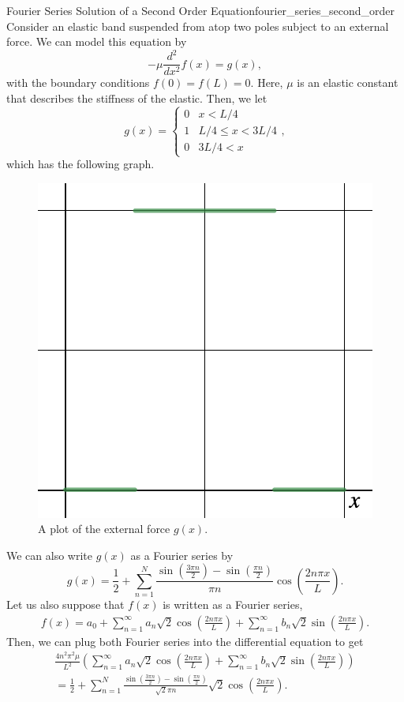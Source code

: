 \begin{ex}{Fourier Series Solution of a Second Order Equation}{fourier_series_second_order}
	Consider an elastic band suspended from atop two poles subject to an external force. We can model this equation by
	\[
	-\mu\frac{d^2}{dx^2}f(x) = g(x),
	\]
	with the boundary conditions $f(0)=f(L)=0$. Here, $\mu$ is an elastic constant that describes the stiffness of the elastic.  Then, we let 
	\[
	g(x) = \begin{cases} 0 & x<L/4 \\ 1 & L/4 \leq x < 3L/4 \\ 0 & 3L/4<x \end{cases},
	\]
	which has the following graph.
	\begin{figure}[H]
		\centering
		\includegraphics[width=.5\textwidth]{Figures_Part_5/square_wave_force.png}
		\caption{A plot of the external force $g(x)$.}
	\end{figure}
	We can also write $g(x)$ as a Fourier series by
	\[
	g(x) = \frac{1}{2}+\sum_{n=1}^{N}\frac{\sin\left(\frac{3\pi n}{2}\right)-\sin\left(\frac{\pi n}{2}\right)}{\pi n}\cos\left(\frac{2n\pi x}{L}\right).
	\]
	Let us also suppose that $f(x)$ is written as a Fourier series,
	\begin{align*}
		f(x) = a_0 + \sum_{n=1}^\infty a_n \sqrt{2} \cos\left(\frac{2n\pi x}{L}\right) + \sum_{n=1}^\infty b_n \sqrt{2} \sin\left(\frac{2n\pi x}{L}\right).
	\end{align*}
	Then, we can plug both Fourier series into the differential equation to get
	\begin{align*}
	\frac{4n^2\pi^2\mu}{L^2} \left(\sum_{n=1}^\infty a_n \sqrt{2} \cos\left(\frac{2n\pi x}{L}\right) + \sum_{n=1}^\infty b_n \sqrt{2} \sin\left(\frac{2n\pi x}{L}\right)\right) \\
	= \frac{1}{2}+\sum_{n=1}^{N}\frac{\sin\left(\frac{3\pi n}{2}\right)-\sin\left(\frac{\pi n}{2}\right)}{\sqrt{2}\pi n}\sqrt{2}\cos\left(\frac{2n\pi x}{L}\right).

\end{align*}
\end{ex}
